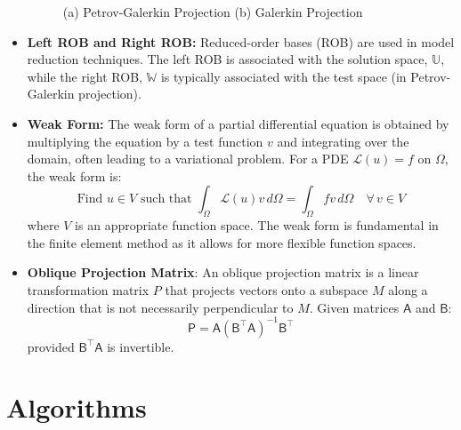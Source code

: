 \documentclass[11pt]{article}
\newcommand{\mat}[1]{\mathsf{#1}}
\begin{document}
\begin{itemize}
\begin{figure}[t]
\begin{subfigure}[b]{0.35\linewidth}
    \caption{}
    \label{fig:projections_G}
    \end{subfigure}
    \caption{(a) Petrov-Galerkin Projection (b) Galerkin Projection}
    \label{fig:projections}
    \end{figure}

    \item \textbf{Left ROB and Right ROB:} Reduced-order bases (ROB) are used in model reduction techniques. The left ROB is associated with the solution space, ${\mathbb{U}}$, while the right ROB, ${\mathbb{W}}$ is typically associated with the test space (in Petrov-Galerkin projection).

    \item \textbf{Weak Form:} The weak form of a partial differential equation is obtained by multiplying the equation by a test function \( v \) and integrating over the domain, often leading to a variational problem. For a PDE \( \mathcal{L}(u) = f \) on \( \Omega \), the weak form is:
    \[
    \text{Find } u \in V \text{ such that } \int_\Omega \mathcal{L}(u) v \, d\Omega = \int_\Omega f v \, d\Omega \quad \forall \, v \in V
    \]
    where \( V \) is an appropriate function space. The weak form is fundamental in the finite element method as it allows for more flexible function spaces.

    \item \textbf{Oblique Projection Matrix}: An oblique projection matrix is a linear transformation matrix \( P \) that projects vectors onto a subspace \( M \) along a direction that is not necessarily perpendicular to \( M \). Given matrices \( \mat{A} \) and \( \mat{B} \):
    \[
    \mat{P} = \mat{A} (\mat{B}^\top \mat{A})^{-1} \mat{B}^\top
    \]
    provided \( \mat{B}^\top \mat{A} \) is invertible.
\end{itemize}

\section{Algorithms}
\label{sec:algorithms}







            
            
            
            
\end{document}
